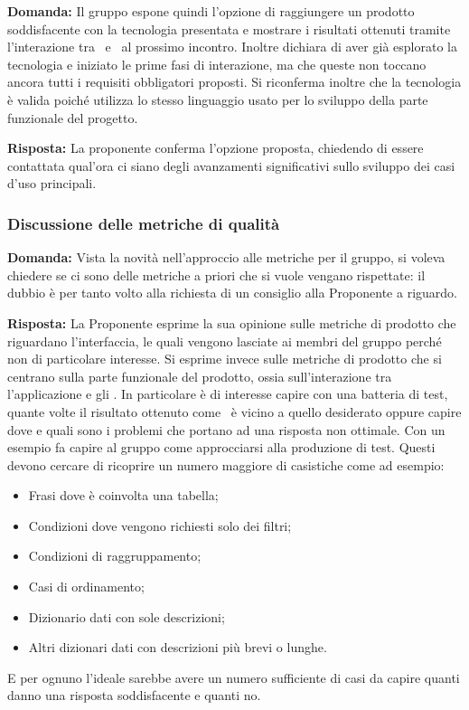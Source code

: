\par \textbf{Domanda:} Il gruppo espone quindi l'opzione di raggiungere un prodotto soddisfacente con la tecnologia presentata e mostrare i risultati ottenuti tramite l'interazione tra \ e \ al prossimo incontro. 
Inoltre dichiara di aver già esplorato la tecnologia e iniziato le prime fasi di interazione, ma che queste non toccano ancora tutti i requisiti obbligatori proposti. 
Si riconferma inoltre che la tecnologia è valida poiché utilizza lo stesso linguaggio usato per lo sviluppo della parte funzionale del progetto.

\par \textbf{Risposta:} La proponente conferma l'opzione proposta, chiedendo di essere contattata qual'ora ci siano degli avanzamenti significativi sullo sviluppo dei casi d'uso principali.

\subsubsection{Discussione delle metriche di qualità}

\par \textbf{Domanda:} Vista la novità nell'approccio alle metriche per il gruppo, si voleva chiedere se ci sono delle metriche a priori che si vuole vengano rispettate: il dubbio è per tanto volto alla richiesta di un consiglio alla Proponente a riguardo.

\par \textbf{Risposta:} La Proponente esprime la sua opinione sulle metriche di prodotto che riguardano l'interfaccia, le quali vengono lasciate ai membri del gruppo perché non di particolare interesse.
Si esprime invece sulle metriche di prodotto che si centrano sulla parte funzionale del prodotto, ossia sull'interazione tra l'applicazione e gli . 
In particolare è di interesse capire con una batteria di test, quante volte il risultato ottenuto come \ è vicino a quello desiderato oppure capire dove e quali sono i problemi che portano ad una risposta non ottimale.
Con un esempio fa capire al gruppo come approcciarsi alla produzione di test. 
Questi devono cercare di ricoprire un numero maggiore di casistiche come ad esempio:
\begin{itemize}
	\item Frasi dove è coinvolta una tabella;
	\item Condizioni dove vengono richiesti solo dei filtri;
	\item Condizioni di raggruppamento;
	\item Casi di ordinamento;
	\item Dizionario dati con sole descrizioni;
	\item Altri dizionari dati con descrizioni più brevi o lunghe.
\end{itemize}
E per ognuno l'ideale sarebbe avere un numero sufficiente di casi da capire quanti danno una risposta soddisfacente e quanti no.

